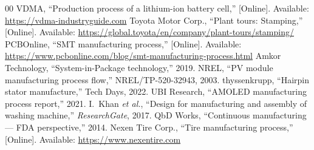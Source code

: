 \begin{thebibliography}{00}
 VDMA, ``Production process of a lithium-ion battery cell,'' [Online]. Available: \url{https://vdma-industryguide.com}
 Toyota Motor Corp., ``Plant tours: Stamping,'' [Online]. Available: \url{https://global.toyota/en/company/plant-tours/stamping/}
 PCBOnline, ``SMT manufacturing process,'' [Online]. Available: \url{https://www.pcbonline.com/blog/smt-manufacturing-process.html}
 Amkor Technology, ``System-in-Package technology,'' 2019.
 NREL, ``PV module manufacturing process flow,'' NREL/TP-520-32943, 2003.
 thyssenkrupp, ``Hairpin stator manufacture,'' Tech Days, 2022.
 UBI Research, ``AMOLED manufacturing process report,'' 2021.
 I.~Khan \textit{et al.}, ``Design for manufacturing and assembly of washing machine,'' \textit{ResearchGate}, 2017.
 QbD Works, ``Continuous manufacturing --- FDA perspective,'' 2014.
 Nexen Tire Corp., ``Tire manufacturing process,'' [Online]. Available: \url{https://www.nexentire.com}
\end{thebibliography}
